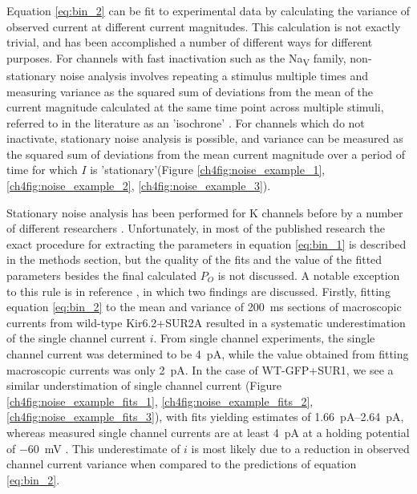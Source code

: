 Equation \ref{eq:bin_2} can be fit to experimental data by calculating the variance of observed current at different current magnitudes.
This calculation is not exactly trivial, and has been accomplished a number of different ways for different purposes.
For channels with fast inactivation such as the Na\textsubscript{V} family, non-stationary noise analysis involves repeating a stimulus multiple times and measuring variance as the squared sum of deviations from the mean of the current magnitude calculated at the same time point across multiple stimuli, referred to in the literature as an 'isochrone' \cite{sigworth_variance_1980}.
For channels which do not inactivate, stationary noise analysis is possible, and variance can be measured as the squared sum of deviations from the mean current magnitude over a period of time for which $I$ is 'stationary'(Figure \ref{ch4fig:noise_example_1}, \ref{ch4fig:noise_example_2}, \ref{ch4fig:noise_example_3}).

Stationary noise analysis has been performed for K\ATP{} channels before by a number of different researchers \cite{shyng_control_1997, cukras_role_2002, babenko_sur-dependent_2002, tammaro_mutation_2007, pratt_sulfonylurea_2009, proks_activation_2010-1, pratt_engineered_2012-1}.
Unfortunately, in most of the published research the exact procedure for extracting the parameters in equation \ref{eq:bin_1} is described in the methods section, but the quality of the fits and the value of the fitted parameters besides the final calculated $P_O$ is not discussed.
A notable exception to this rule is in reference \cite{tammaro_mutation_2007}, in which two findings are discussed.
Firstly, fitting equation \ref{eq:bin_2} to the mean and variance of \SI{200}{\milli\second} sections of macroscopic currents from wild-type Kir6.2+SUR2A resulted in a systematic underestimation of the single channel current $i$.
From single channel experiments, the single channel current was determined to be \SI{4}{\pico\ampere}, while the value obtained from fitting macroscopic currents was only \SI{2}{\pico\ampere}.
In the case of WT-GFP+SUR1, we see a similar understimation of single channel current (Figure \ref{ch4fig:noise_example_fits_1}, \ref{ch4fig:noise_example_fits_2}, \ref{ch4fig:noise_example_fits_3}), with fits yielding estimates of \SIrange{1.66}{2.64}{\pico\ampere}, whereas measured single channel currents are at least \SI{4}{\pico\ampere} at a holding potential of \SI{-60}{\milli\volt} \cite{shyng_control_1997, proks_mutations_2001}.
This underestimate of $i$ is most likely due to a reduction in observed channel current variance when compared to the predictions of equation \ref{eq:bin_2}. 

